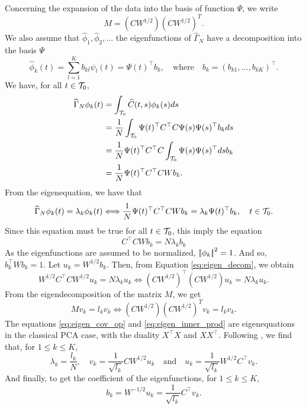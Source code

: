 Concerning the expansion of the data into the basis of function $\Psi$, we write 
\begin{equation}
    M = \left(C W^{1/2}\right)\left(C W^{1/2}\right)^T.
\end{equation}
We also assume that $\widehat{\phi}_1, \widehat{\phi}_2, \dots$ the eigenfunctions of $\widehat{\Gamma}_N$ have a decomposition into the basis $\Psi$
\begin{equation}
    \widehat{\phi}_k(t) = \sum_{l = 1}^K b_{kl}\psi_l(t) = \Psi(t)^\top b_k, \quad\text{where}\quad b_k = \left(b_{k 1}, \dots, b_{k K}\right)^\top.
\end{equation}
We have, for all $t \in \mathcal{T}_{0}$, 
\begin{align*}
    \widehat{\Gamma}_N \phi_k(t) &= \int_{\mathcal{T}_{0}} \widehat{C}(t, s)\phi_k(s)ds \\
    &= \frac{1}{N}\int_{\mathcal{T}_{0}} \Psi(t)^\top C^\top C \Psi(s) \Psi(s)^\top b_k ds \\
    &= \frac{1}{N} \Psi(t)^\top C^\top C \int_{\mathcal{T}_{0}} \Psi(s) \Psi(s)^\top ds b_k \\
    &= \frac{1}{N} \Psi(t)^\top C^\top C W b_k.\\
\end{align*}
From the eigenequation, we have that
\begin{equation}
    \widehat{\Gamma}_N \phi_k(t) = \lambda_k \phi_k(t) \Longleftrightarrow \frac{1}{N} \Psi(t)^\top C^\top C W b_k = \lambda_k \Psi(t)^\top b_k, \quad t \in \mathcal{T}_{0}.
\end{equation}
Since this equation must be true for all $t \in \mathcal{T}_{0}$, this imply the equation
\begin{equation}\label{eq:eigen_decom}
    C^\top C W b_k = N\lambda_k b_k
\end{equation}
As the eigenfunctions are assumed to be normalized, $\left|\!\left|\phi_k\right|\!\right|^2 = 1$. And so, $b_k^\top W b_k = 1$. Let $u_k = W^{1/2}b_k$. Then, from Equation \eqref{eq:eigen_decom}, we obtain
\begin{equation}\label{eq:eigen_cov_op}
    W^{1/2} C^\top C W^{1/2} u_k = N\lambda_k u_k \Longleftrightarrow \left(C W^{1/2}\right)^\top \left(C W^{1/2}\right) u_k = N\lambda_k u_k.
\end{equation}
From the eigendecomposition of the matrix $M$, we get
\begin{equation}\label{eq:eigen_inner_prod}
    Mv_k = l_k v_k \Longleftrightarrow \left(C W^{1/2}\right)\left(C W^{1/2}\right)^T v_k = l_k v_k.
\end{equation}
The equations \eqref{eq:eigen_cov_op} and \eqref{eq:eigen_inner_prod} are eigenequations in the classical PCA case, with the duality $X^\top X$ and $XX^\top$. Following \cite{pagesMultipleFactorAnalysis2014}, we find that, for $1 \leq k \leq K$,
\begin{equation}
    \lambda_k = \frac{l_k}{N}, \quad v_k = \frac{1}{\sqrt{l_k}}C W^{1/2} u_k \quad\text{and}\quad u_k = \frac{1}{\sqrt{l_k}} W^{1/2} C^\top v_k.
\end{equation}
And finally, to get the coefficient of the eigenfunctions, for $1 \leq k \leq K$,
\begin{equation}
    b_k = W^{-1/2}u_k = \frac{1}{\sqrt{l_k}} C^\top v_k.
\end{equation}



